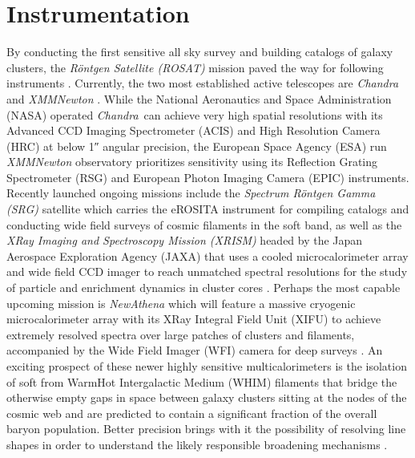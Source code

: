 \section{Instrumentation}
\label{sec:instrumentation}
\vspace{-0.5\baselineskip}

By conducting the first sensitive all sky \xray survey and building
catalogs of galaxy clusters, the \textit{Röntgen Satellite (ROSAT)}
mission paved the way for following instruments \cite{true1982}.
Currently, the two most established active telescopes are
\textit{Chandra} and \textit{XMM{\dash\hspace{0.01em}}Newton}
\cite{weis2000, jans2001}. While the National Aeronautics and
Space Administration (NASA) operated \textit{Chandra}~can achieve
very high spatial resolutions with its Advanced CCD Imaging Spectrometer
(ACIS) and High Resolution Camera (HRC) at below \ang{;;1}
angular precision, the European Space Agency (ESA) run
\textit{XMM{\dash\hspace{0.01em}}Newton} observatory prioritizes sensitivity
using its Reflection Grating Spectrometer (RSG) and European Photon
Imaging Camera (EPIC) instruments. Recently launched ongoing missions include
the \textit{Spectrum Röntgen Gamma (SRG)} satellite which carries the eROSITA
instrument for compiling catalogs and conducting wide field surveys of cosmic
filaments in the soft \xray band, as well as the \textit{X{\hspace{-0.03em}\dash\hspace{0.03em}}Ray
Imaging and Spectroscopy Mission (XRISM)} headed by the Japan Aerospace Exploration
Agency (JAXA) that uses a cooled microcalorimeter array and wide field CCD imager
to reach unmatched spectral resolutions for the study of particle and enrichment
dynamics in cluster cores \cite{pred2021, tash2024, zhan2026}. Perhaps the most
capable upcoming mission is \textit{NewAthena} which will feature a massive
cryogenic microcalorimeter array with its X{\hspace{-0.03em}\dash\hspace{0.04em}}Ray
Integral Field Unit (XIFU) to achieve extremely resolved spectra over large patches of
clusters and filaments, accompanied by the Wide Field Imager (WFI) camera for deep
surveys \cite{crui2025}. An exciting prospect of these newer highly sensitive multicalorimeters
is the isolation of soft \xrays from Warm{\hspace{0.03em}\dash}Hot Intergalactic Medium (WHIM) filaments that
bridge the otherwise empty gaps in space between galaxy clusters sitting at the nodes of the cosmic web
and are predicted to contain a significant fraction of the overall baryon population. Better precision
brings with it the possibility of resolving line shapes in order to understand the likely responsible
broadening mechanisms \cite{boeh2010}.
